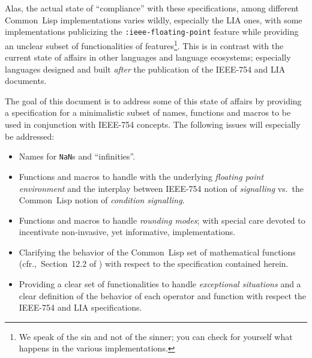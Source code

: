 \documentclass[10pt,fleqn]{article}
\newcommand{\CL}{\textsf{Common~Lisp}}
\newcommand{\marginnote}[1]{%
\marginpar{\begin{small}\begin{em}
{\raggedright #1}
\end{em}\end{small}}}
\newcommand{\code}[1]{\texttt{#1}}
\newcommand{\clterm}[1]{\textit{#1}}
\newcommand{\IEEEFPStd}{IEEE-754}
\begin{document}
\vspace*{3mm}

\noindent
Alas, the actual state of ``compliance'' with these specifications,
among different \CL{} implementations varies wildly, especially the
LIA ones, with some implementations publicizing the
\code{:ieee-floating-point} feature while providing an unclear subset
of functionalities of features\footnote{We speak of the sin and not of
  the sinner; you can check for yourself what happens in the various
  implementations.}.  This is in contrast with the current state of
affairs in other languages and language ecosystems; especially
languages designed and built \emph{after} the publication of the
\IEEEFPStd{} and LIA documents.

\vspace*{3mm}

The goal of this document is to address some of this state of affairs
by providing a specification for a minimalistic subset of
names,\marginnote{Not very ``minimalistic'' anymore\ldots}
functions and macros to be used in conjunction with \IEEEFPStd{}
concepts.  The following issues will especially 
be addressed:
\begin{itemize}
\item Names for \code{NaN}s and ``infinities''.
  
\item Functions and macros to handle with the underlying
  \emph{floating point environment} and the interplay between \IEEEFPStd{}
  notion of \emph{signalling} vs.~the \CL{} notion of
  \clterm{condition signalling}.
  
\item Functions and macros to handle \emph{rounding modes}; with
  special care devoted to incentivate non-invasive, yet informative,
  implementations.
  
\item Clarifying the behavior of the \CL{} set of mathematical
  functions (cfr.,~Section~12.2 of \cite{1996:ANSIHyperSpec}) with respect
  to the specification contained herein.

\item Providing a clear set of functionalities to handle
  \emph{exceptional situations} and a clear definition of the behavior
  of each operator and function with respect the \IEEEFPStd{} and LIA
  specifications.
\end{itemize}

\vspace*{3mm}
\end{document}
